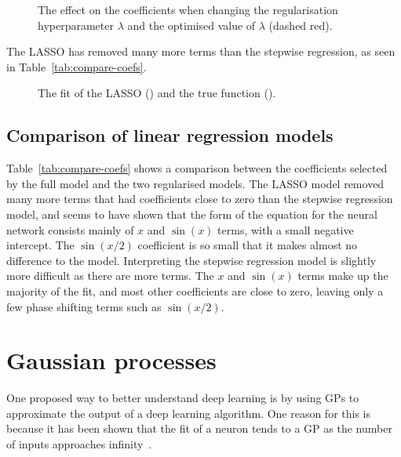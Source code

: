 \begin{figure}[htbp]
	\centering
	
	\caption{The effect on the coefficients when changing the regularisation hyperparameter \(\lambda\) and the optimised value of \(\lambda\) (dashed red).}
	\label{fig:lasso-lambda}
\end{figure}


The \ac{LASSO} has removed many more terms than the stepwise regression, as seen in Table~\ref{tab:compare-coefs}.

\begin{figure}[htbp]
	\centering
	
	\caption{The fit of the \ac{LASSO} (\lassocolour) and the true function (\truthcolour).}
	\label{fig:lasso-fit}
\end{figure}

\subsection{Comparison of linear regression models}

Table~\ref{tab:compare-coefs} shows a comparison between the coefficients selected by the full model and the two regularised models.
The \ac{LASSO} model removed many more terms that had coefficients close to zero than the stepwise regression model, and seems to have shown that the form of the equation for the neural network consists mainly of \(x\) and \(\sin(x)\) terms, with a small negative intercept.
The \(\sin(x/2)\) coefficient is so small that it makes almost no difference to the model.
Interpreting the stepwise regression model is slightly more difficult as there are more terms.
The \(x\) and \(\sin(x)\) terms make up the majority of the fit, and most other coefficients are close to zero, leaving only a few phase shifting terms such as \(\sin(x/2)\).


\section{Gaussian processes}

One proposed way to better understand deep learning is by using \acp{GP} to approximate the output of a deep learning algorithm.
One reason for this is because it has been shown that the fit of a neuron tends to a \ac{GP} as the number of inputs approaches infinity~\autocite{neal1996}.

